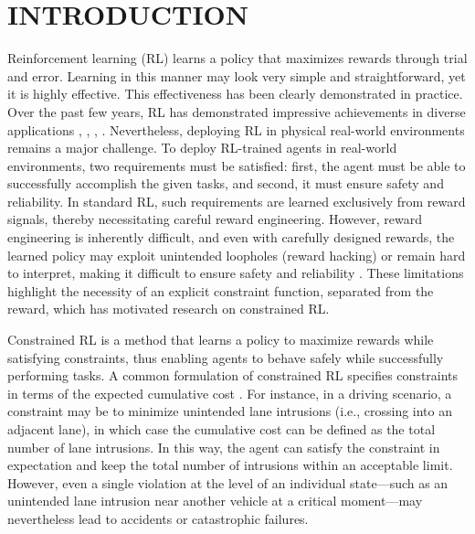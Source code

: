 \section{INTRODUCTION}

Reinforcement learning (RL) learns a policy that maximizes rewards through trial and error.
Learning in this manner may look very simple and straightforward, yet it is highly effective.
This effectiveness has been clearly demonstrated in practice.
Over the past few years, RL has demonstrated impressive achievements in diverse applications \cite{silver2017mastering}, \cite{andrychowicz2020learning}, \cite{schrittwieser2020mastering}, \cite{ouyang2022training}.
Nevertheless, deploying RL in physical real-world environments remains a major challenge.
To deploy RL-trained agents in real-world environments, two requirements must be satisfied:
first, the agent must be able to successfully accomplish the given tasks, and second, it must ensure safety and reliability.
In standard RL, such requirements are learned exclusively from reward signals, thereby necessitating careful reward engineering.
However, reward engineering is inherently difficult, and even with carefully designed rewards, the learned policy may exploit unintended loopholes (reward hacking) or remain hard to interpret, making it difficult to ensure safety and reliability \cite{amodei2016concrete}.
These limitations highlight the necessity of an explicit constraint function, separated from the reward, which has motivated research on constrained RL.

Constrained RL is a method that learns a policy to maximize rewards while satisfying constraints, thus enabling agents to behave safely while successfully performing tasks.
A common formulation of constrained RL specifies constraints in terms of the expected cumulative cost \cite{brunke2022safe}.
For instance, in a driving scenario, a constraint may be to minimize unintended lane intrusions (i.e., crossing into an adjacent lane), in which case the cumulative cost can be defined as the total number of lane intrusions.
In this way, the agent can satisfy the constraint in expectation and keep the total number of intrusions within an acceptable limit.
However, even a single violation at the level of an individual state---such as an unintended lane intrusion near another vehicle at a critical moment---may nevertheless lead to accidents or catastrophic failures.

